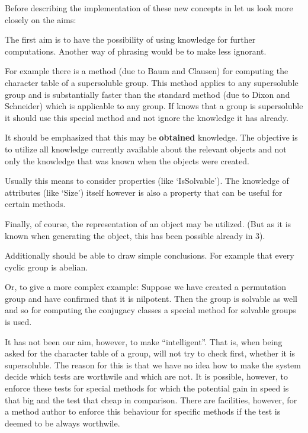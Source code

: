 
Before describing the implementation of these new concepts in {\GAP} let us
look more closely on the aims:


The first aim is to have the possibility of using knowledge for further
computations. Another way of phrasing would be to make {\GAP} less ignorant.

For example there is a method (due to Baum and Clausen) for computing the
character table of a supersoluble group. This method applies to any
supersoluble group and is substantially faster than the standard method (due
to Dixon and Schneider) which is applicable to any group. If {\GAP} knows that
a group is supersoluble it should use this special method and not ignore the
knowledge it has already.

It should be emphasized that this may be {\bf obtained} knowledge. The
objective is to utilize all knowledge currently available about the relevant
objects and not only the knowledge that was known when the objects were
created.

Usually this means to consider properties (like `IsSolvable'). The
knowledge of attributes (like `Size') itself however is also a property
that can be useful for certain methods.

Finally, of course, the representation of an object may be utilized. (But 
as it is known when generating the object, this has been possible already in
{\GAP} 3).

Additionally {\GAP} should be able to draw simple conclusions. For example that
every cyclic group is abelian.

Or, to give a more complex example: Suppose we have created a permutation
group and have confirmed that it is nilpotent. Then the group is solvable as
well and so for computing the conjugacy classes a special method for
solvable groups is used.

It has not been our aim, however, to make {\GAP} ``intelligent''. That is, when
being asked for the character table of a group, {\GAP} will not try to check
first, whether it is supersoluble. The reason for this is that we have no
idea how to make the system decide which tests are worthwile and which are
not. It is possible, however, to enforce these tests for special methods
for which the potential gain in speed is that big and the test that cheap
in comparison. There are facilities, however, for a method author to enforce
this behaviour for specific methods if the test is deemed to be always
worthwile.

